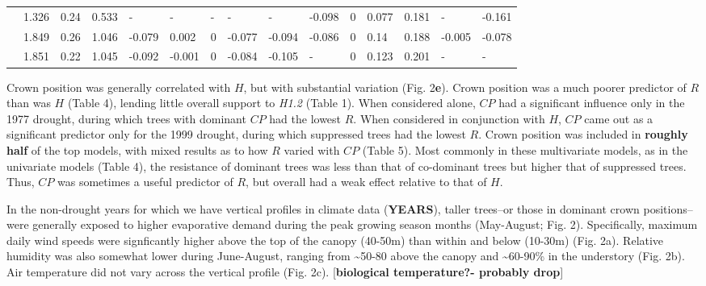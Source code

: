 \documentclass[]{article}
\begin{document}
\begin{table}[!h]
{\begin{tabular}{lrrrlllllllllll}
\hspace{1em} & 1.326 & 0.24 & 0.533 & - & - & - & - & - & -0.098 & 0 & 0.077 & 0.181 & - & -0.161\\
\hspace{1em} & 1.849 & 0.26 & 1.046 & -0.079 & 0.002 & 0 & -0.077 & -0.094 & -0.086 & 0 & 0.14 & 0.188 & -0.005 & -0.078\\
\hspace{1em} & 1.851 & 0.22 & 1.045 & -0.092 & -0.001 & 0 & -0.084 & -0.105 & - & 0 & 0.123 & 0.201 & - & -\\
\bottomrule
\end{tabular}}
\end{table}

\raggedright

Crown position was generally correlated with \(H\), but with substantial
variation (Fig. 2\textbf{e}). Crown position was a much poorer predictor
of \(R\) than was \(H\) (Table 4), lending little overall support to
\emph{H1.2} (Table 1). When considered alone, \(CP\) had a significant
influence only in the 1977 drought, during which trees with dominant
\(CP\) had the lowest \(R\). When considered in conjunction with \(H\),
\(CP\) came out as a significant predictor only for the 1999 drought,
during which suppressed trees had the lowest \(R\). Crown position was
included in \textbf{roughly half} of the top models, with mixed results
as to how \(R\) varied with \(CP\) (Table 5). Most commonly in these
multivariate models, as in the univariate models (Table 4), the
resistance of dominant trees was less than that of co-dominant trees but
higher that of suppressed trees. Thus, \(CP\) was sometimes a useful
predictor of \(R\), but overall had a weak effect relative to that of
\(H\).

In the non-drought years for which we have vertical profiles in climate
data (\textbf{YEARS}), taller trees--or those in dominant crown
positions-- were generally exposed to higher evaporative demand during
the peak growing season months (May-August; Fig. 2). Specifically,
maximum daily wind speeds were signficantly higher above the top of the
canopy (40-50m) than within and below (10-30m) (Fig. 2a). Relative
humidity was also somewhat lower during June-August, ranging from
\textasciitilde{}50-80 above the canopy and \textasciitilde{}60-90\% in
the understory (Fig. 2b). Air temperature did not vary across the
vertical profile (Fig. 2c). {[}\textbf{biological temperature?- probably
drop}{]}
\end{document}
